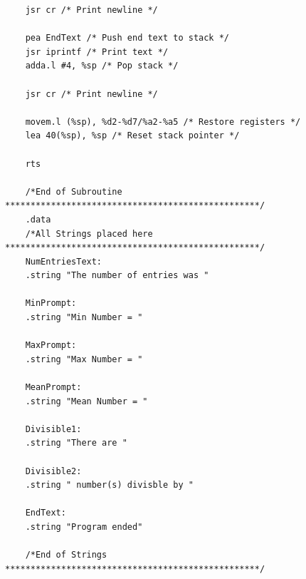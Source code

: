 \documentclass[10pt, letterpaper, titlepage]{article} %
\begin{document}
\begin{lstlisting}
	jsr cr /* Print newline */
	
	pea EndText /* Push end text to stack */
	jsr iprintf /* Print text */
	adda.l #4, %sp /* Pop stack */
	
	jsr cr /* Print newline */
	
	movem.l (%sp), %d2-%d7/%a2-%a5 /* Restore registers */
	lea 40(%sp), %sp /* Reset stack pointer */
	
	rts
	
	/*End of Subroutine **************************************************/
	.data
	/*All Strings placed here **************************************************/
	NumEntriesText:
	.string "The number of entries was "
	
	MinPrompt:
	.string "Min Number = "
	
	MaxPrompt:
	.string "Max Number = "
	
	MeanPrompt:
	.string "Mean Number = "
	
	Divisible1:
	.string "There are "
	
	Divisible2:
	.string " number(s) divisble by "
	
	EndText:
	.string "Program ended"
	
	/*End of Strings **************************************************/
\end{lstlisting}
\end{document}
